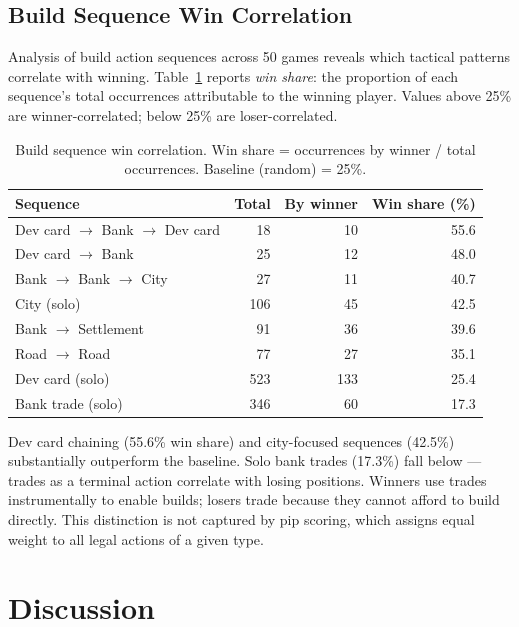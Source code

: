 \documentclass[12pt,a4paper]{article}
\begin{document}
{\subsection{Build Sequence Win Correlation}

Analysis of build action sequences across 50 games reveals which
tactical patterns correlate with winning. Table~\ref{tab:builds} reports
\textit{win share}: the proportion of each sequence's total occurrences
attributable to the winning player. Values above 25\% are
winner-correlated; below 25\% are loser-correlated.

\begin{table}[H]
  \centering
  \caption{Build sequence win correlation. Win share = occurrences by
  winner / total occurrences. Baseline (random) = 25\%.}
  \label{tab:builds}
  \begin{tabular}{lrrr}
    \toprule
    \textbf{Sequence} & \textbf{Total} & \textbf{By winner} &
    \textbf{Win share (\%)} \\
    \midrule
    Dev card $\to$ Bank $\to$ Dev card & 18  & 10 & 55.6 \\
    Dev card $\to$ Bank                & 25  & 12 & 48.0 \\
    Bank $\to$ Bank $\to$ City         & 27  & 11 & 40.7 \\
    City (solo)                        & 106 & 45 & 42.5 \\
    Bank $\to$ Settlement              & 91  & 36 & 39.6 \\
    Road $\to$ Road                    & 77  & 27 & 35.1 \\
    Dev card (solo)                    & 523 & 133 & 25.4 \\
    Bank trade (solo)                  & 346 & 60  & 17.3 \\
    \bottomrule
  \end{tabular}
\end{table}

Dev card chaining (55.6\% win share) and city-focused sequences (42.5\%)
substantially outperform the baseline. Solo bank trades (17.3\%) fall
below --- trades as a terminal action correlate with losing positions.
Winners use trades instrumentally to enable builds; losers trade because
they cannot afford to build directly. This distinction is not captured by
pip scoring, which assigns equal weight to all legal actions of a given
type.

\section{Discussion}

}
\end{document}
